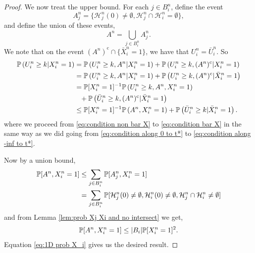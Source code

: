 \begin{proof}
		We now treat the upper bound. For each $j \in B_i^n$, define the event
		\begin{equation}
			A_j^n = \{ \mathcal{H}_j^n(0) \neq \emptyset, \mathcal{H}_j^n \cap \mathcal{H}_i^n = \emptyset\}, 
		\end{equation}
		and define the union of these events,
		\begin{equation}
			A^n = \bigcup_{j \in B_i^n} A_j^n.
		\end{equation}
		We note that on the event $({A^n})^\mathrm{c} \cap \{\bar{X}_i^n = 1\}$, we have that $U_i^n = \bar{U}_i^n$. So 
		\begin{align}
			\prob\left(U_i^n \geq k | X_i^n = 1 \right) &= \prob\left(U_i^n \geq k, A^n | X_i^n = 1 \right) + \prob\left(U_i^n \geq k, (A^n)^\mathrm{c} | X_i^n = 1 \right) \label{eq:condition non bar X}\\
			&= \prob\left(U_i^n \geq k, A^n | X_i^n = 1 \right) + \prob\left(U_i^n \geq k, (A^n)^\mathrm{c} | \bar{X}_i^n = 1 \right) \label{eq:condition bar X}\\
			&= \prob[X_i^n = 1] ^{-1} \prob\left(U_i^n \geq k, A^n, X_i^n = 1\right) \\
			&\phantom{=} + \prob\left(\bar{U}_i^n \geq k, (A^n)^\mathrm{c}| \bar{X}_i^n = 1\right)\\ 
			&\leq \prob[X_i^n = 1] ^{-1} \prob\left(A^n, X_i^n = 1\right) + \prob\left(\bar{U}_i^n \geq k| \bar{X}_i^n = 1\right).%
		\end{align}
		where we proceed from \eqref{eq:condition non bar X} to \eqref{eq:condition bar X} in the same way as we did going from \eqref{eq:condition along 0 to t*} to \eqref{eq:condition along -inf to t*}.

		Now by a union bound,
		\begin{align}
			\mathbb{P}[A^n, X_i^n = 1] &\leq \sum_{j \in B_i^n} \mathbb{P}[A_j^n, X_i^n = 1]\\
				&= \sum_{j \in B_i^n} \mathbb{P}[\mathcal{H}_j^n(0) \neq \emptyset, \mathcal{H}_i^n(0) \neq \emptyset, \mathcal{H}_j^n \cap \mathcal{H}_i^n \neq \emptyset]
		\end{align}
		and from Lemma \ref{lem:prob Xj Xi and no intersect} we get,
		\begin{equation}
			\mathbb{P}[A^n, X_i^n = 1] \leq |B_i| \mathbb{P}[X_i^n = 1]^2.
		\end{equation}
		Equation \eqref{eq:1D prob X_i} gives us the desired result.
	\end{proof}

